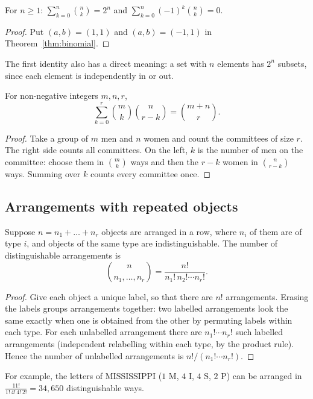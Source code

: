 \begin{corollary}\label{cor:sums}
For $n\ge 1$: $\displaystyle\sum_{k=0}^n\binom nk=2^n$ and
$\displaystyle\sum_{k=0}^n(-1)^k\binom nk=0$.
\end{corollary}
\begin{proof}
Put $(a,b)=(1,1)$ and $(a,b)=(-1,1)$ in Theorem~\ref{thm:binomial}.
\end{proof}

The first identity also has a direct meaning: a set with $n$ elements has $2^n$
subsets, since each element is independently in or out.

\begin{theorem}\label{thm:vander}
For non-negative integers $m,n,r$,
\[
\sum_{k=0}^r\binom mk\binom n{r-k}=\binom{m+n}{r}.
\]
\end{theorem}
\begin{proof}
Take a group of $m$ men and $n$ women and count the committees of size $r$. The
right side counts all committees. On the left, $k$ is the number of men on the
committee: choose them in $\binom mk$ ways and then the $r-k$ women in
$\binom n{r-k}$ ways. Summing over $k$ counts every committee once.
\end{proof}

\subsection{Arrangements with repeated objects}

\begin{theorem}\label{thm:multinomial}
Suppose $n=n_1+\dots+n_r$ objects are arranged in a row, where $n_i$ of them are
of type $i$, and objects of the same type are indistinguishable. The number of
distinguishable arrangements is
\[
\binom{n}{n_1,\dots,n_r}=\frac{n!}{n_1!\,n_2!\cdots n_r!}.
\]
\end{theorem}
\begin{proof}
Give each object a unique label, so that there are $n!$ arrangements. Erasing
the labels groups arrangements together: two labelled arrangements look the
same exactly when one is obtained from the other by permuting labels within
each type. For each unlabelled arrangement there are $n_1!\cdots n_r!$ such
labelled arrangements (independent relabelling within each type, by the product
rule). Hence the number of unlabelled arrangements is
$n!/(n_1!\cdots n_r!)$.
\end{proof}

For example, the letters of MISSISSIPPI ($1$ M, $4$ I, $4$ S, $2$ P) can be
arranged in $\frac{11!}{1!\,4!\,4!\,2!}=34{,}650$ distinguishable ways.

